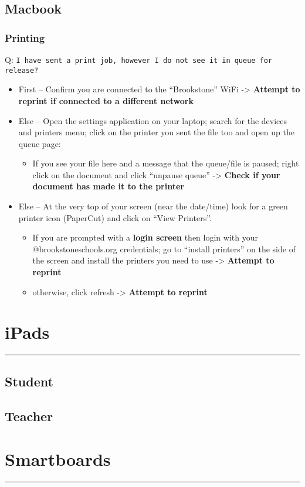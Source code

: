\documentclass[11pt]{article}
\begin{document}
\subsection{Macbook}
\label{sec:org4f4a144}
\subsubsection{Printing}
\label{sec:org240e6c0}
Q: \texttt{I have sent a print job, however I do not see it in queue for release?}
\begin{itemize}
\item First -- Confirm you are connected to the ``Brookstone'' WiFi -> \textbf{Attempt to reprint if connected to a different network}
\item Else -- Open the settings application on your laptop; search for the devices and printers menu; click on the printer you sent the file too and open up the queue page:
\begin{itemize}
\item If you see your file here and a message that the queue/file is paused; right click on the document and click ``unpause queue'' -> \textbf{Check if your document has made it to the printer}
\end{itemize}

\item Else -- At the very top of your screen (near the date/time) look for a green printer icon (PaperCut) and click on ``View Printers''.
\begin{itemize}
\item If you are prompted with a \textbf{login screen} then login with your @brookstoneschools.org credentials; go to ``install printers'' on the side of the screen and install the printers you need to use -> \textbf{Attempt to reprint}
\item otherwise, click refresh -> \textbf{Attempt to reprint}
\end{itemize}
\end{itemize}
\section{iPads}
\label{sec:org7336aa3}
\noindent\rule{\textwidth}{0.5pt}
\subsection{Student}
\label{sec:orga0c2244}
\subsection{Teacher}
\label{sec:orge655423}
\section{Smartboards}
\label{sec:orgd347777}
\noindent\rule{\textwidth}{0.5pt}
\end{document}
